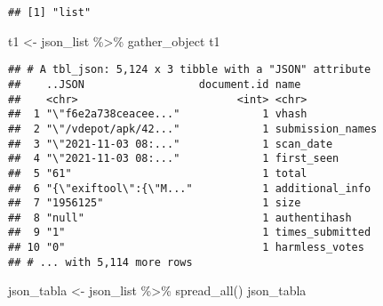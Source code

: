 \documentclass[
]{book}
\newenvironment{Shaded}{\begin{snugshade}}{\end{snugshade}}
\newcommand{\FunctionTok}[1]{\textcolor[rgb]{0.00,0.00,0.00}{#1}}
\newcommand{\NormalTok}[1]{#1}
\newcommand{\OtherTok}[1]{\textcolor[rgb]{0.56,0.35,0.01}{#1}}
\newcommand{\SpecialCharTok}[1]{\textcolor[rgb]{0.00,0.00,0.00}{#1}}
\begin{document}
\begin{verbatim}
## [1] "list"
\end{verbatim}

\begin{Shaded}
\begin{Highlighting}[]
\NormalTok{t1 }\OtherTok{\textless{}{-}}\NormalTok{ json\_list }\SpecialCharTok{\%\textgreater{}\%}\NormalTok{ gather\_object}
\NormalTok{t1}
\end{Highlighting}
\end{Shaded}

\begin{verbatim}
## # A tbl_json: 5,124 x 3 tibble with a "JSON" attribute
##    ..JSON                  document.id name            
##    <chr>                         <int> <chr>           
##  1 "\"f6e2a738ceacee..."             1 vhash           
##  2 "\"/vdepot/apk/42..."             1 submission_names
##  3 "\"2021-11-03 08:..."             1 scan_date       
##  4 "\"2021-11-03 08:..."             1 first_seen      
##  5 "61"                              1 total           
##  6 "{\"exiftool\":{\"M..."           1 additional_info 
##  7 "1956125"                         1 size            
##  8 "null"                            1 authentihash    
##  9 "1"                               1 times_submitted 
## 10 "0"                               1 harmless_votes  
## # ... with 5,114 more rows
\end{verbatim}

\begin{Shaded}
\begin{Highlighting}[]
\NormalTok{json\_tabla }\OtherTok{\textless{}{-}}\NormalTok{ json\_list }\SpecialCharTok{\%\textgreater{}\%}
  \FunctionTok{spread\_all}\NormalTok{()}
\NormalTok{json\_tabla}
\end{Highlighting}
\end{Shaded}
\end{document}
